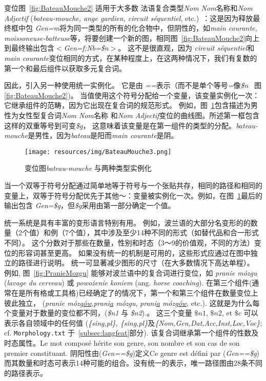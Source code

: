 \bigskip
\noindent 变位图~\ref{fig:BateauMouche2} 适用于大多数
法语复合类型\emph{Nom Nom}名称和\emph{Nom Adjectif} (\emph{bateau-mouche, ange
gardien, circuit séquentiel}, etc.)~：这是因为释放最终框中包 \emph{Gen=m}将为同一类型的所有的化合物中，但阴性的，如\emph{main courante, moissoneuse-batteuse}等，将要创建一个新的图，相同图~\ref{fig:BateauMouche2}向上到最终输出包含\emph{$<$Gen=f;Nb=\$n$>$}。
这不是很直观，因为 \emph{circuit séquentiel}和\emph{main courante}变位相同的方式，在某种程度上，在这两种情况下，我们有复数的第一个和最后组件以获取多元复合词。


\bigskip
\noindent 因此，引入另一种使用统一实例化。
它是由 \emph{==}表示（而不是单个等号\emph{=}像\emph{\$n} ~图\ref{fig:BateauMouche2})。
当值使用这个符号分配给一个变量，该变量实例化一次：
它继承组件的范畴，因为它出现在复合词的规范形式。
例如，图~\ref{fig:BateauMouche3}包含描述为男性为女性型复合词\emph{Nom Nom}名称
和\emph{Nom Adjectif}变位的曲线图。所述第一框包含这样的双重等号到可变\emph{\$g}，
这意味着该变量是在第一组件的类型的分配。\emph{bateau-mouche}是男性，因为\emph{bateau}是阳而\emph{main courante}是阴。


\begin{figure}[!htb]
  \centering
  \texttt{[image: resources/img/BateauMouche3.png]}
  \caption{变位图\emph{bateau-mouche} 与两种类型实例化}
  \label{fig:BateauMouche3}
\end{figure}

\bigskip
\noindent 

当一个双等于符号分配通过简单地等于符号与一个张贴共存，相同的路径和相同的变量上，双等于符号分配优先于其他〜：变量被实例化一次。例如，在图~\ref{fig:BateauMouche3}最后的输出包含 \emph{Gen=\$g}，但\emph{\$g}采用由第一部分确定一个值。

\bigskip
\noindent 统一系统是具有丰富的变形语言特别有用。
例如，波兰语的大部分名变形的的数量（2个值）和例（7个值），其中涉及至少14种不同的形式（如替代品和合一形式不同）。
这个分数对于那些在数量，性别和时态（3〜9的价值观，不同的方法）变位的形容词甚至更高。
如果没有统一的机制是可用的，这些形式应通过在图中独立的路径进行说明。
统一可显著减少图形的尺寸（在大多数情况下高达单程）。
\bigskip
\noindent 例如, 图~\ref{fig:PranieMozgu} 能够对波兰语中的复合词进行变位，如 \emph{pranie m\'ozgu} (\emph{lavage du cerveau}) 或 \emph{powo\.zenie koniem} (ang. \emph{horse coaching}). 
在第三个组件(通常在是所有格或工具格)已经确定了的情况下，第一个和第三个组件在数量变位上彼此独立， (\emph{pranie m\'ozg\underline{\'ow}},\emph{prani\underline{a} m\'ozgu}, \emph{prani\underline{a} m\'ozg\underline{\'ow}}, etc.).
这就是为什么每个变量对于数量的变位都不同，(\emph{\$n1} 与 \emph{\$n2}).。
这三个变量 $\$n1$, $\$n2$, et $\$c$ 可以表示各自领域中的任何值  (\emph{\{sing,pl\}, \{sing,pl\}}及\emph{\{Nom,Gen,Dat,Acc,Inst,Loc,Voc\}}; cf. \verb+Morphology.txt+ 于~\ref{subsec:langfeat}部分).
该复合词继承第一个组件的性数及时态属性。Le mot composé hérite son genre, son nombre et son cas de son premier constituant. 
阴阳性由(\emph{Gen==\$g})定义Ce genre est
défini par (\emph{Gen==\$g}) 
而其数量和时态可表示14种可能的组合。没有统一的表示，唯一路径图由28条不同的路径表示。

